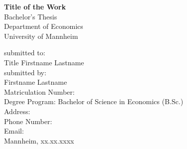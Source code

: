 
\begin{titlepage}

\begin{center}

\vspace*{1.2cm}

\huge {\bfseries Title of the Work}\\[1.8cm]

\Large {Bachelor's Thesis}\\[1cm]

\large {Department of Economics}\\[0.2cm]

\large {University of Mannheim}\\[0.5cm]

\end{center}

\vfill

\noindent submitted to:\\
Title Firstname Lastname\\[1cm]
submitted by:\\
Firstname Lastname\\[1cm]
Matriculation Number:\\
Degree Program: Bachelor of Science in Economics (B.Sc.)\\[1cm]
Address:\\
Phone Number:\\
Email:\\[1cm]
Mannheim, xx.xx.xxxx

\setcounter{page}{0}

\end{titlepage}
